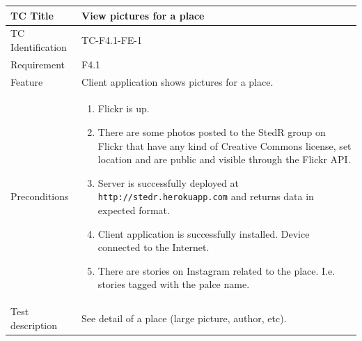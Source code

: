 \documentclass[11pt]{book}
\begin{document}
\begin{table}
  \begin{tabular}{| p{3cm} | p{9.5cm} |} \hline 
    TC Title              & View pictures for a place \\ \hline 
    TC Identification     & TC-F4.1-FE-1 \\ \hline 
    Requirement           & F4.1 \\ \hline 
    Feature               & Client application shows pictures for a place. \\ \hline 
    Preconditions         & \begin{enumerate}
                              \item Flickr is up.
                              \item There are some photos posted to the StedR group on Flickr that have any kind of
                               Creative Commons license, set location and are public and visible through the Flickr API.
                              \item Server is successfully deployed at \texttt{http://stedr.herokuapp.com} and returns data in expected format.
                              \item Client application is successfully installed. Device connected to the Internet.
                              \item There are stories on Instagram related to the place. I.e. stories tagged with the palce name.
                            \end{enumerate} \\ \hline 

    Test description      & See detail of a place (large picture, author, etc).


\end{tabular}
\end{table}
\end{document}
